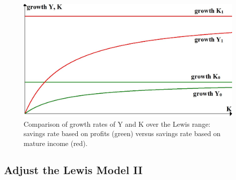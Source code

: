 \documentclass[a4paper]{article}
\begin{document}
\begin{figure}[!ht]
\includegraphics[width=\textwidth]{Growth1.jpg}
\caption{Comparison of growth rates of Y and K over the Lewis range: savings rate based on profits (green) versus  savings rate based on mature income (red).}
\end{figure}
\newpage
\subsection{Adjust the Lewis Model II}
\end{document}
